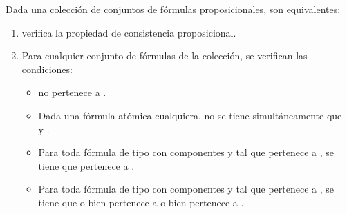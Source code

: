 \begin{isabellebody}
\begin{isamarkuptext}
  \begin{lema}
    Dada una colección  de conjuntos de fórmulas proposicionales, son equivalentes:
    \begin{enumerate}
      \item {} verifica la propiedad de consistencia proposicional.
      \item Para cualquier conjunto de fórmulas  de la colección, se verifican las 
      condiciones:
      \begin{itemize}
        \item \isa{{\isasymbottom}} no pertenece a .
        \item Dada  una fórmula atómica cualquiera, no se tiene 
        simultáneamente que\\  y .
        \item Para toda fórmula de tipo \isa{{\isasymalpha}} con componentes  y  tal que \isa{{\isasymalpha}}
        pertenece a , se tiene que  pertenece a .
        \item Para toda fórmula de tipo \isa{{\isasymbeta}} con componentes  y  tal que \isa{{\isasymbeta}}
        pertenece a , se tiene que o bien  pertenece a  o 
        bien  pertenece a .
      \end{itemize} 
    \end{enumerate}
  \end{lema}


\end{isamarkuptext}
\end{isabellebody}
